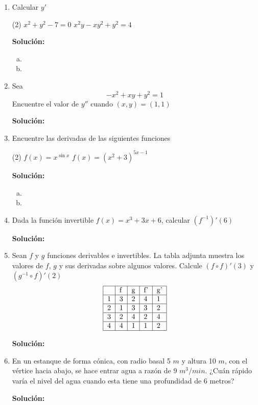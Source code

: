 \documentclass[12pt]{article}
\newenvironment{solucion}
{\begin{mdframed}[backgroundcolor=black!10]
		{\bf Solución:}\\
	}
	{
	\end{mdframed}
}
\newenvironment{preguntas}
{\begin{enumerate}\itemsep12pt
	}
	{
	\end{enumerate}
}
\begin{document}
\begin{preguntas}
\item Calcular $y'$
\begin{tasks}(2)
\task $x^2+y^2-7=0$
\task $x^2y-xy^2+y^2=4$
\end{tasks}
\begin{solucion}

\begin{enumerate}[a)]
\item 
\item 
\end{enumerate}
\end{solucion}
\item Sea
$$-x^2+xy+y^2=1$$
Encuentre el valor de $y''$ cuando $(x,y)=(1,1)$
\begin{solucion}

\end{solucion}
\item Encuentre las derivadas de las siguientes funciones
\begin{tasks}(2)
\task $f(x) = x^{\sin x}$
\task $f(x) = (x^2+3)^{5x-1}$
\end{tasks}
\begin{solucion}

\begin{enumerate}[a)]
\item 
\item 
\end{enumerate}
\end{solucion}
\item Dada la función invertible $f(x) = x^3 + 3x + 6$, calcular $(f^{-1})'(6)$
\begin{solucion}

\end{solucion}
\item Sean $f$ y $g$ funciones derivables e invertibles. La tabla adjunta muestra los valores de $f$, $g$ y sus derivadas sobre algunos valores. Calcule $(f \circ f)'(3)$ y $(g^{-1} \circ f)'(2)$
$$
\begin{tabular}{|l|l|l|l|l|}
\hline
  & f & g & f' & g' \\ \hline
1 & 3 & 2 & 4  & 1  \\ \hline
2 & 1 & 3 & 3  & 2  \\ \hline
3 & 2 & 4 & 2  & 4  \\ \hline
4 & 4 & 1 & 1  & 2  \\ \hline
\end{tabular}
$$
\begin{solucion}

\end{solucion}
\item En un estanque de forma cónica, con radio basal 5 $m$ y altura 10 $m$, con el vértice hacia abajo, se hace entrar agua a razón de 9 $m^3/min$. ¿Cuán rápido varía el nivel del agua cuando esta tiene una profundidad de 6 metros?
\begin{solucion}

\end{solucion}
\end{preguntas}
\end{document}
